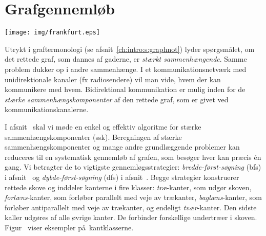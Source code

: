 \chapter{Grafgennemløb}
\renewcommand{\labelprefix}{ch:gtraverse}
\llabel{}
\vspace*{-4.5cm}
\begin{flushright}
\texttt{[image: img/frankfurt.eps]}
\end{flushright}


Utrykt i graftermonologi (se afsnit~\ref{ch:intro:s:graphnot}) lyder spørgsmålet, om det rettede graf, som dannes af gaderne, er \emph{stærkt sammenhængende}.
Samme problem dukker op i andre sammenhænge.
I et kommunikationsnetværk med unidirektionale kanaler (fx radiosendere) vil man vide, hvem der kan kommunikere med hvem.
Bidirektional kommunikation
er mulig inden for de \emph{stærke sammenhængskomponenter}
 af den rettede graf, som er givet ved kommunikationskanalerne.

I afsnit~ skal vi møde en enkel og effektiv algoritme for stærke sammenhængskomponenter (ssk).
Beregningen af stærke sammenhængskomponenter og mange andre grundlæggende problemer kan reduceres til en systematisk gennemløb af grafen, som besøger hver kan præcis én gang.
Vi betragter de to vigtigste gennemløgsstrategier:
\emph{bredde-først-søgning} (bfs)
i afsnit~ og
\emph{dybde-først-søgning} (dfs)
i afsnit~.
Begge strategier konstruerer rettede skove og inddeler kanterne i fire klasser:
\emph{træ}-kanter, som udgør skoven,
\emph{forlæns}-kanter,
som forløber parallelt med veje av trækanter,
\emph{baglæns}-kanter,
som forløber antiparallelt med veje av trækanter,
og endeligt \emph{tvær}-kanter.
Den sidste kaller udgøres af alle øvrige kanter.
De forbinder forskellige undertræer i skoven.
Figur~ viser eksempler på kantklasserne.


